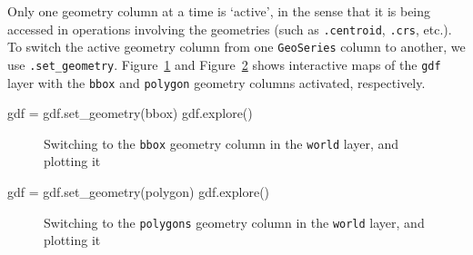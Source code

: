 \documentclass[
  letterpaper,
]{krantz}
\newenvironment{Shaded}{\begin{snugshade}}{\end{snugshade}}
\newcommand{\NormalTok}[1]{\textcolor[rgb]{0.00,0.23,0.31}{#1}}
\newcommand{\OperatorTok}[1]{\textcolor[rgb]{0.37,0.37,0.37}{#1}}
\newcommand{\StringTok}[1]{\textcolor[rgb]{0.13,0.47,0.30}{#1}}
\begin{document}
Only one geometry column at a time is `active', in the sense that it is
being accessed in operations involving the geometries (such as
\texttt{.centroid}, \texttt{.crs}, etc.). To switch the active geometry
column from one \texttt{GeoSeries} column to another, we use
\texttt{.set\_geometry}. Figure~\ref{fig-switch-to-centroids} and
Figure~\ref{fig-switch-to-polygons} shows interactive maps of the
\texttt{gdf} layer with the
\texttt{\textquotesingle{}bbox\textquotesingle{}} and
\texttt{\textquotesingle{}polygon\textquotesingle{}} geometry columns
activated, respectively.

\begin{Shaded}
\begin{Highlighting}[]
\NormalTok{gdf }\OperatorTok{=}\NormalTok{ gdf.set\_geometry(}\StringTok{\textquotesingle{}bbox\textquotesingle{}}\NormalTok{)}
\NormalTok{gdf.explore()}
\end{Highlighting}
\end{Shaded}

\begin{figure}


\caption{\label{fig-switch-to-centroids}Switching to the
\texttt{\textquotesingle{}bbox\textquotesingle{}} geometry column in the
\texttt{world} layer, and plotting it}

\end{figure}%

\begin{Shaded}
\begin{Highlighting}[]
\NormalTok{gdf }\OperatorTok{=}\NormalTok{ gdf.set\_geometry(}\StringTok{\textquotesingle{}polygon\textquotesingle{}}\NormalTok{)}
\NormalTok{gdf.explore()}
\end{Highlighting}
\end{Shaded}

\begin{figure}


\caption{\label{fig-switch-to-polygons}Switching to the
\texttt{\textquotesingle{}polygons\textquotesingle{}} geometry column in
the \texttt{world} layer, and plotting it}

\end{figure}%
\end{document}
